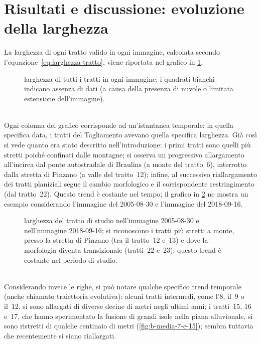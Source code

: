 \section{Risultati e discussione: evoluzione della larghezza}
\label{sec:larghezza}
La larghezza di ogni tratto valido in ogni immagine, calcolata secondo l'equazione~\eqref{eq:larghezza-tratto}, viene riportata nel grafico in \cref{graph:larghezze-tutti-tratti}.
%
\begin{figure}
	\centering
	
	\caption[larghezza di tutti i tratti in ogni immagine]{larghezza di tutti i tratti in ogni immagine; i quadrati bianchi indicano assenza di dati (a causa della presenza di nuvole o limitata estensione dell'immagine).}
	\label{graph:larghezze-tutti-tratti}
\end{figure}
%
\\
Ogni colonna del grafico corrisponde ad un'istantanea temporale: in quella specifica data, i tratti del Tagliamento avevano quella specifica larghezza.
Già così si vede quanto era stato descritto nell'introduzione:
i primi tratti sono quelli più stretti poiché confinati dalle montagne;
si osserva un progressivo allargamento all'incirca dal ponte autostradale di Braulins (a monte del tratto~6), interrotto dalla stretta di Pinzano (a valle del tratto~12);
infine, al successivo riallargamento dei tratti planiziali segue il cambio morfologico e il corrispondente restringimento (dal tratto~22).
Questo trend è costante nel tempo; il grafico in \cref{graph:larghezza-2005-2018-09} ne mostra un esempio considerando l'immagine \AST{} del 2005-08-30 e l'immagine \Se{} del 2018-09-16.
%
\begin{figure}
	\centering
	
	\caption[larghezza del tratto di studio nel 2005-08-30 e nel 2018-09-16]{larghezza del tratto di studio nell'immagine \AST{} 2005-08-30 e nell'immagine \Se{} 2018-09-16; si riconoscono i tratti più stretti a monte, presso la stretta di Pinzano (tra il tratto~12 e~13) e dove la morfologia diventa transizionale (tratti~22 e~23); questo trend è costante nel periodo di studio.}
	\label{graph:larghezza-2005-2018-09}
\end{figure}
%
\\
Considerando invece le righe, si può notare qualche specifico trend temporale (anche chiamato traiettoria evolutiva):
alcuni tratti intermedi, come l'8, il~9 o il~12, si sono allargati di diverse decine di metri negli ultimi anni;
i tratti~15, 16 e~17, che hanno sperimentato la fusione di grandi isole nella piana alluvionale, si sono ristretti di qualche centinaio di metri (\cref{fig:b-media-7-e-15}); sembra tuttavia che recentemente si siano riallargati.
